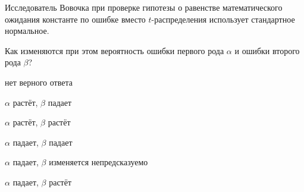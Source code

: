 
\begin{question}
Исследователь Вовочка при проверке гипотезы о равенстве математического
ожидания константе по ошибке вместо \(t\)-распределения использует
стандартное нормальное.

Как изменяются при этом вероятность ошибки первого рода \(\alpha\) и
ошибки второго рода \(\beta\)?
\begin{answerlist}
  \item нет верного ответа
  \item \(\alpha\) растёт, \(\beta\) падает
  \item \(\alpha\) растёт, \(\beta\) растёт
  \item \(\alpha\) падает, \(\beta\) падает
  \item \(\alpha\) падает, \(\beta\) изменяется непредсказуемо
  \item \(\alpha\) падает, \(\beta\) растёт
\end{answerlist}
\end{question}


